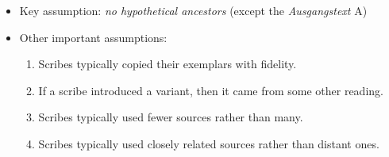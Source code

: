 \documentclass[10pt]{beamer}
\begin{document}
	\begin{frame}
		\begin{itemize}
			\item Key assumption: \emph{no hypothetical ancestors} (except the \emph{Ausgangstext} A)
			\item Other important assumptions:
			\begin{enumerate}
				\item Scribes typically copied their exemplars with fidelity.
				\item If a scribe introduced a variant, then it came from some other reading.
				\item Scribes typically used fewer sources rather than many.
				\item Scribes typically used closely related sources rather than distant ones.
			\end{enumerate}
		\end{itemize}
	\end{frame}
\end{document}
